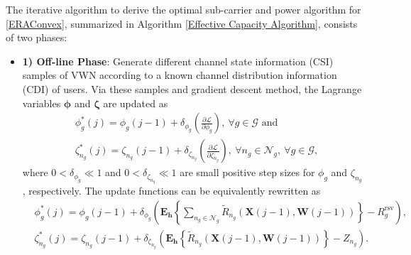 \documentclass[journal,draftclsnofoot,12pt,onecolumn]{IEEEtran}
\begin{document}
The iterative algorithm to derive the optimal sub-carrier and power algorithm for \eqref{ERAConvex}, summarized in Algorithm \ref{Effective Capacity Algorithm}, consists of two phases:
\begin{itemize}
 \item[] \textbf{1) Off-line Phase}: Generate different {channel state information (CSI)} samples of VWN according to a known channel distribution information (CDI) of users. Via these samples and gradient descent method, the Lagrange variables $\boldsymbol{\phi}$ and $\boldsymbol{\zeta}$ are updated as
 \begin{align}
 &\phi_g^*(j) = \phi_g(j-1) + \delta_{\phi_g}(\frac{\partial \mathcal{L}}{\partial \phi_g}),~\forall g\in \mathcal{G} \text{ and }\nonumber\\
 &\zeta_{n_g}^*(j) = \zeta_{n_g}(j-1) + \delta_{\zeta_{n_g}}(\frac{\partial \mathcal{L}}{\partial \zeta_{n_g}}),~\forall n_g \in \mathcal{N}_g,~\forall g\in \mathcal{G},\nonumber
 \end{align}
where $0<\delta_{\phi_g} \ll 1$ and $0<\delta_{\zeta_{n_g}} \ll 1$ are small positive step sizes for $\phi_g$ and $\zeta_{n_g}$, respectively. The update functions can be equivalently rewritten as
\begin{align}
&\phi_g^*(j) =\phi_g(j-1) + \delta_{\phi_g}( \textbf{E}_{\textbf{h}}\left\lbrace \sum\limits_{n_g \in \mathcal{N}_g}\widetilde{R}_{n_g}(\textbf{X}(j-1),\textbf{W}(j-1))\right\rbrace - R_g^\text{rsv} ),\label{phiUpdate}\\
&\zeta_{n_g}^*(j) = \zeta_{n_g}(j-1) + \delta_{\zeta_{n_g}}(\textbf{E}_{\textbf{h}}\left\lbrace  \widetilde{R}_{n_g}(\textbf{X}(j-1),\textbf{W}(j-1))\right\rbrace - Z_{n_g}).  \label{zetaUpdate}
\end{align}


\end{itemize}
\end{document}
